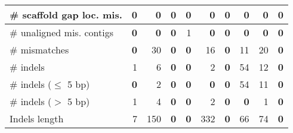 \documentclass[12pt,a4paper]{article}
\begin{document}
\begin{table}[ht]
\begin{center}
\begin{tabular}{|l*{9}{|r}|}
\# scaffold gap loc. mis. & 0 & 0 & 0 & 0 & 0 & 0 & 0 & 0 & 0 \\ \hline
\# unaligned mis. contigs & {\bf 0} & {\bf 0} & {\bf 0} & 1 & {\bf 0} & {\bf 0} & {\bf 0} & {\bf 0} & {\bf 0} \\ \hline
\# mismatches & {\bf 0} & 30 & {\bf 0} & {\bf 0} & 16 & {\bf 0} & 11 & 20 & {\bf 0} \\ \hline
\# indels & 1 & 6 & {\bf 0} & {\bf 0} & 2 & {\bf 0} & 54 & 12 & {\bf 0} \\ \hline
\hspace{5mm}\# indels ($\leq$ 5 bp) & {\bf 0} & 2 & {\bf 0} & {\bf 0} & {\bf 0} & {\bf 0} & 54 & 11 & {\bf 0} \\ \hline
\hspace{5mm}\# indels ($>$ 5 bp) & 1 & 4 & {\bf 0} & {\bf 0} & 2 & {\bf 0} & {\bf 0} & 1 & {\bf 0} \\ \hline
Indels length & 7 & 150 & {\bf 0} & {\bf 0} & 332 & {\bf 0} & 66 & 74 & {\bf 0} \\ \hline
\end{tabular}
\end{center}
\end{table}
\end{document}
